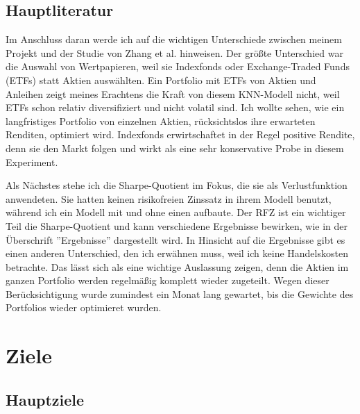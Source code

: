 \documentclass[12pt]{article}
\begin{document}
        \subsection{Hauptliteratur}
        
            Im Anschluss daran werde ich auf die wichtigen Unterschiede zwischen meinem Projekt 
            und der Studie von Zhang et al. \cite{zhang2020} hinweisen. 
            Der größte Unterschied war die Auswahl von Wertpapieren, 
            weil sie Indexfonds oder Exchange-Traded Funds (ETFs) statt Aktien auswählten. 
            Ein Portfolio mit ETFs von Aktien und Anleihen zeigt meines Erachtens die Kraft von diesem KNN-Modell nicht, 
            weil ETFs schon relativ diversifiziert und nicht volatil sind. 
            Ich wollte sehen, wie ein langfristiges Portfolio von einzelnen Aktien, 
            rücksichtslos ihre erwarteten Renditen, optimiert wird. Indexfonds erwirtschaftet in der Regel positive Rendite, 
            denn sie den Markt folgen und wirkt als eine sehr konservative Probe in diesem Experiment.

            Als Nächstes stehe ich die Sharpe-Quotient im Fokus, die sie als Verlustfunktion anwendeten. 
            Sie hatten keinen risikofreien Zinssatz in ihrem Modell benutzt, während ich ein Modell mit und ohne einen aufbaute. 
            Der RFZ ist ein wichtiger Teil die Sharpe-Quotient und kann verschiedene Ergebnisse bewirken, 
            wie in der Überschrift ''Ergebnisse'' dargestellt wird. In Hinsicht auf die Ergebnisse gibt es einen anderen Unterschied, 
            den ich erwähnen muss, weil ich keine Handelskosten betrachte. Das lässt sich als eine wichtige Auslassung zeigen, 
            denn die Aktien im ganzen Portfolio werden regelmäßig komplett wieder zugeteilt. 
            Wegen dieser Berücksichtigung wurde zumindest ein Monat lang gewartet, 
            bis die Gewichte des Portfolios wieder optimieret wurden.

    \newpage \section{Ziele}
    
        \subsection{Hauptziele}
        
\end{document}
